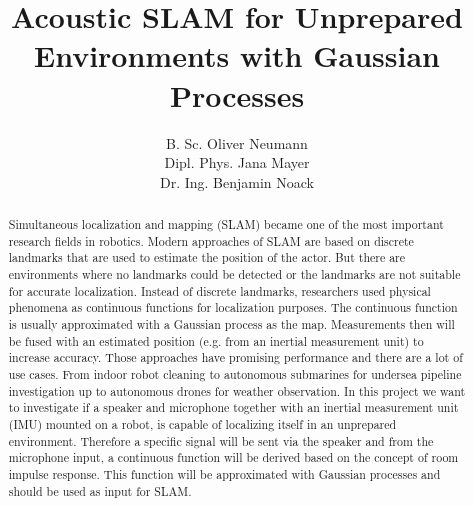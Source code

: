 \documentclass[runningheads]{llncs}
\begin{document}
%
\title{Acoustic SLAM for Unprepared Environments with Gaussian Processes}
%
%
\author{B. Sc. Oliver Neumann \\
Dipl. Phys. Jana Mayer \\
Dr. Ing. Benjamin Noack}

%
\maketitle              %
%

\begin{abstract}

Simultaneous localization and mapping (SLAM) became one of the most important research fields in robotics. Modern approaches of SLAM are based on discrete landmarks that are used to estimate the position of the actor. But there are environments where no landmarks could be detected or the landmarks are not suitable for accurate localization.
Instead of discrete landmarks, researchers used physical phenomena as continuous functions for localization purposes. The continuous function is usually approximated with a Gaussian process as the map. Measurements then will be fused with an estimated position (e.g. from an inertial measurement unit) to increase accuracy.
Those approaches have promising performance and there are a lot of use cases. From indoor robot cleaning to autonomous submarines for undersea pipeline investigation up to autonomous drones for weather observation.
In this project we want to investigate if a speaker and microphone together with an inertial measurement unit (IMU)  mounted on a robot, is capable of localizing itself in an unprepared environment. Therefore a specific signal will be sent via the speaker and from the microphone input, a continuous function will be derived based on the concept of room impulse response.  This function will be approximated with Gaussian processes and should be used as input for SLAM.

\end{abstract}







\nocite{*}


{}


\end{document}
